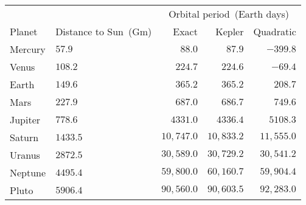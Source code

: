 \begin{tabular}{llrrr}                                                 \toprule
        &                      & \multicolumn{3}{c}{Orbital period~(Earth days)} \\
  \cmidrule{3-5}
Planet  & Distance to Sun~(Gm) & Exact      & Kepler     & Quadratic  \\\midrule
Mercury & $57.9$               & $88.0$     & $87.9$     & $-399.8$   \\[4pt]
Venus   & $108.2$              & $224.7$    & $224.6$    & $-69.4$    \\[4pt]
Earth   & $149.6$              & $365.2$    & $365.2$    & $208.7$    \\[4pt]
Mars    & $227.9$              & $687.0$    & $686.7$    & $749.6$    \\[4pt]
Jupiter & $778.6$              & $4331.0$   & $4336.4$   & $5108.3$   \\[4pt]
Saturn  & $1433.5$             & $10,747.0$ & $10,833.2$ & $11,555.0$ \\[4pt]
Uranus  & $2872.5$             & $30,589.0$ & $30,729.2$ & $30,541.2$ \\[4pt]
Neptune & $4495.4$             & $59,800.0$ & $60,160.7$ & $59,904.4$ \\[4pt]
Pluto   & $5906.4$             & $90,560.0$ & $90,603.5$ & $92,283.0$ \\\bottomrule
\end{tabular}
